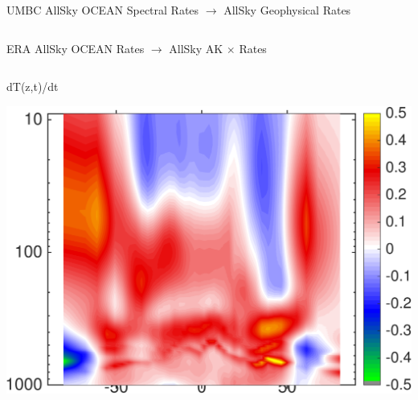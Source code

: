 \documentclass[10pt,t]{beamer}
\begin{document}
\begin{frame}{UMBC AllSky OCEAN Spectral Rates $\rightarrow$ AllSky Geophysical Rates}
\begin{columns}
\begin{column}{0.45\columnwidth}

\end{column}
\end{columns}
\end{frame}


\begin{frame}{ERA AllSky OCEAN Rates $\rightarrow$ AllSky AK $\times$ Rates}
\vspace{-0.35in}

\begin{columns}
\begin{column}{0.45\columnwidth}
\begin{block}{\footnotesize dT(z,t)/dt}
\vspace{-0.1in}
\begin{center}
\includegraphics[width=\linewidth]{Figs/CloudAnom/Desc_ocean/ak_x_ERAtzrates.png}
\end{center}
\end{block}
\end{column}


\end{columns}
\end{frame}
\end{document}
